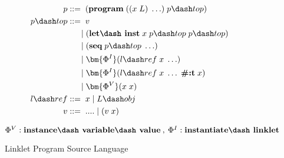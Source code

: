 \begin{figure}[!htbp]
    \centering
    \small
    \begin{align*}
    p           &::=\; (\textbf{program}\; ((x\; L)\; \ldots)\; p\dash top) \\
    p\dash top  &::=\; v \\
    \;          &\;\hspace*{1.4em}|\; (\textbf{let\dash inst}\; x\; p\dash top\;p\dash top) \\
    \;          &\;\hspace*{1.4em}|\; (\textbf{seq}\; p\dash top\; \ldots) \\
    \;          &\;\hspace*{1.4em}|\; \bm{\Phi^I}(l\dash ref\; x\; \ldots) \\
    \;          &\;\hspace*{1.4em}|\; \bm{\Phi^I}(l\dash ref\; x\; \ldots\; \textbf{\#:t}\; x) \\
    \;          &\;\hspace*{1.4em}|\; \bm{\Phi^V}(x\; x) \\
    l\dash ref &::=\; x\; |\; L\dash obj \\
    v           &::=\; ....\;|\;(v\;x) \\
    \end{align*}

    \vspace{-1em}

    \footnotesize $\Phi^V : \textbf{instance\dash variable\dash value}\:,\: \Phi^I : \textbf{instantiate\dash linklet}$
    \caption{Linklet Program Source Language}
    \label{fig:linklet-program-source-language}
\end{figure}